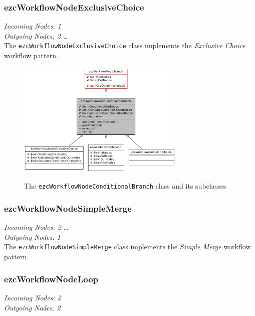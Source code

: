 \subsubsection{ezcWorkflowNodeExclusiveChoice}

\emph{Incoming Nodes: 1}\\
\emph{Outgoing Nodes: 2 \dots *}\\

The \texttt{ezcWorkflowNodeExclusiveChoice} class implements the
\emph{Exclusive Choice} workflow pattern.

\begin{figure}[hbt]
\begin{center}
\includegraphics[width=8cm]{figures/WorkflowNodeConditionalBranch}\\[5mm]
\end{center}
\caption{The \texttt{ezcWorkflowNodeConditionalBranch} class and its subclasses}
\label{classezcWorkflowNodeConditionalBranch}
\end{figure}

\subsubsection{ezcWorkflowNodeSimpleMerge}

\emph{Incoming Nodes: 2 \dots *}\\
\emph{Outgoing Nodes: 1}\\

The \texttt{ezcWorkflowNodeSimpleMerge} class implements the \emph{Simple Merge}
workflow pattern.

\subsubsection{ezcWorkflowNodeLoop}

\emph{Incoming Nodes: 2}\\
\emph{Outgoing Nodes: 2}\\

